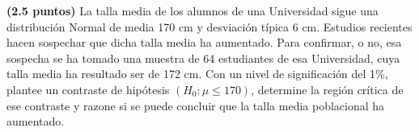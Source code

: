 
\textbf{(2.5 puntos)} La talla media de los alumnos de una Universidad sigue una distribución Normal de media 170 cm y desviación típica 6 cm. Estudios recientes hacen sospechar que dicha talla media ha aumentado. Para confirmar, o no, esa sospecha se ha tomado una muestra de 64 estudiantes de esa Universidad, cuya talla media ha resultado ser de 172 cm. Con un nivel de significación del 1\%, plantee un contraste de hipótesis $(H_0:\mu\leq170)$, determine la región crítica de ese contraste y razone si se puede concluir que la talla media poblacional ha aumentado.
